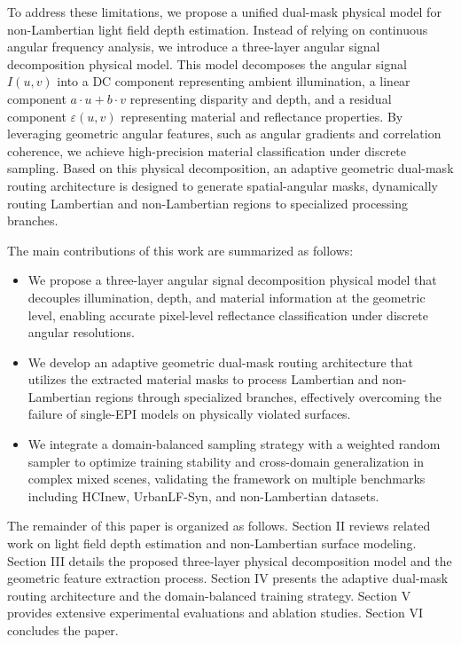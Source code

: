 \documentclass[lettersize,journal]{IEEEtran}
\begin{document}
To address these limitations, we propose a unified dual-mask physical model for non-Lambertian light field depth estimation. Instead of relying on continuous angular frequency analysis, we introduce a three-layer angular signal decomposition physical model. This model decomposes the angular signal $I(u,v)$ into a DC component representing ambient illumination, a linear component $a \cdot u + b \cdot v$ representing disparity and depth, and a residual component $\varepsilon(u,v)$ representing material and reflectance properties. By leveraging geometric angular features, such as angular gradients and correlation coherence, we achieve high-precision material classification under discrete sampling. Based on this physical decomposition, an adaptive geometric dual-mask routing architecture is designed to generate spatial-angular masks, dynamically routing Lambertian and non-Lambertian regions to specialized processing branches.

The main contributions of this work are summarized as follows:
\begin{itemize}
\item We propose a three-layer angular signal decomposition physical model that decouples illumination, depth, and material information at the geometric level, enabling accurate pixel-level reflectance classification under discrete angular resolutions.
\item We develop an adaptive geometric dual-mask routing architecture that utilizes the extracted material masks to process Lambertian and non-Lambertian regions through specialized branches, effectively overcoming the failure of single-EPI models on physically violated surfaces.
\item We integrate a domain-balanced sampling strategy with a weighted random sampler to optimize training stability and cross-domain generalization in complex mixed scenes, validating the framework on multiple benchmarks including HCInew, UrbanLF-Syn, and non-Lambertian datasets.
\end{itemize}

The remainder of this paper is organized as follows. Section II reviews related work on light field depth estimation and non-Lambertian surface modeling. Section III details the proposed three-layer physical decomposition model and the geometric feature extraction process. Section IV presents the adaptive dual-mask routing architecture and the domain-balanced training strategy. Section V provides extensive experimental evaluations and ablation studies. Section VI concludes the paper.
\end{document}

